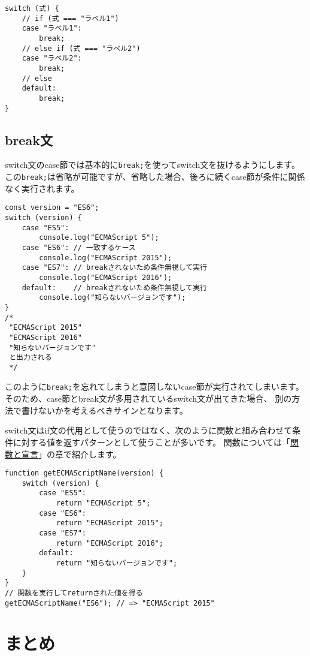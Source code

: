\begin{lstlisting}
switch (式) {
    // if (式 === "ラベル1")
    case "ラベル1":
        break;
    // else if (式 === "ラベル2")
    case "ラベル2":
        break;
    // else
    default:
        break;
}
\end{lstlisting}

\hypertarget{break-statement}{%
\subsection{break文}\label{break-statement}}

switch文のcase節では基本的に\texttt{break;}を使ってswitch文を抜けるようにします。
この\texttt{break;}は省略が可能ですが、省略した場合、後ろに続くcase節が条件に関係なく実行されます。

\begin{lstlisting}
const version = "ES6";
switch (version) {
    case "ES5":
        console.log("ECMAScript 5");
    case "ES6": // 一致するケース
        console.log("ECMAScript 2015");
    case "ES7": // breakされないため条件無視して実行
        console.log("ECMAScript 2016");
    default:    // breakされないため条件無視して実行
        console.log("知らないバージョンです");
}
/*
 "ECMAScript 2015"
 "ECMAScript 2016"
 "知らないバージョンです"
 と出力される
 */
 \end{lstlisting}

このように\texttt{break;}を忘れてしまうと意図しないcase節が実行されてしまいます。
そのため、case節とbreak文が多用されているswitch文が出てきた場合、
別の方法で書けないかを考えるべきサインとなります。

switch文はif文の代用として使うのではなく、次のように関数と組み合わせて条件に対する値を返すパターンとして使うことが多いです。
関数については「\hyperlink{function-and-declaration}{関数と宣言}」の章で紹介します。

\begin{lstlisting}
function getECMAScriptName(version) {
    switch (version) {
        case "ES5":
            return "ECMAScript 5";
        case "ES6":
            return "ECMAScript 2015";
        case "ES7":
            return "ECMAScript 2016";
        default:
            return "知らないバージョンです";
    }
}
// 関数を実行してreturnされた値を得る
getECMAScriptName("ES6"); // => "ECMAScript 2015"
\end{lstlisting}

\hypertarget{conclusion}{%
\section{まとめ}\label{conclusion}}

